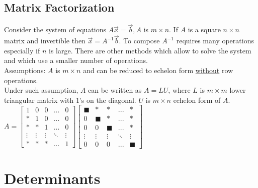 \documentclass[a4paper,12pt,openany]{book}
\theoremstyle{defn}
\theoremstyle{expl}
\begin{document}
\section{Matrix Factorization}
\noindent Consider the system of equations $A\vec{x}=\vec{b}, A$ is $m\times n$. If $A$ is a square $n\times n$ matrix and invertible then $\vec{x}=A^{-1}\vec{b}$. To compose $A^{-1}$ requires many operations especially if $n$ is large. There are other methods which allow to solve the system and which use a smaller number of operations.\\
Assumptions: $A$ is $m\times n$ and can be reduced to echelon form \underline{without} row operations.\\
Under such assumption, $A$ can be written as $A=LU$, where $L$ is $m\times m$ lower triangular matrix with $1$'s on the diagonal. $U$ is $m\times n$ echelon form of $A$.\\
$A=\left[\begin{array}{ccccc}
1&0&0&...&0\\
*&1&0&...&0\\
*&*&1&...&0\\
\vdots&\vdots&\vdots&\ddots&\vdots\\
*&*&*&...&1\end{array}\right]\left[\begin{array}{ccccc}
\blacksquare&*&*&...&*\\
0&\blacksquare&*&...&*\\
0&0&\blacksquare&...&*\\
\vdots&\vdots&\vdots&\ddots&\vdots\\
0&0&0&...&\blacksquare
\end{array}\right]$
\chapter{Determinants}
\end{document}
